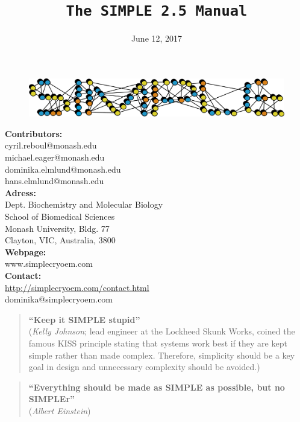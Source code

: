\documentclass[a4paper,11pt]{article}
\newcommand{\prgname}[1]{\textcolor{NavyBlue}{\texttt{#1}}}
\begin{document}
\begin{figure}
\centering
\includegraphics[keepaspectratio=true,scale=0.6]{./SIMPLE_logo/rawlogo}
\end{figure}

\title{\prgname{The SIMPLE 2.5 Manual}}
\date{June 12, 2017}
\maketitle

\vspace{1em}
\begin{minipage}[ht]{0.48\textwidth}
\textbf{Contributors:}\\
cyril.reboul@monash.edu\\
michael.eager@monash.edu\\
dominika.elmlund@monash.edu\\
hans.elmlund@monash.edu\\
\textbf{Adress:}\\
Dept. Biochemistry and Molecular Biology\\
School of Biomedical Sciences\\
Monash University, Bldg. 77\\
Clayton, VIC, Australia, 3800\\
\textbf{Webpage:}\\
www.simplecryoem.com\\
\textbf{Contact:}\\
\url{http://simplecryoem.com/contact.html}\\
dominika@simplecryoem.com\\
\end{minipage}
\vspace{20pt}

\begin{quote}
\textbf{``Keep it SIMPLE stupid''}\\(\textit{Kelly Johnson}; lead engineer at the Lockheed Skunk Works, coined the famous KISS principle stating that systems work best if they are kept simple rather than made complex. Therefore, simplicity should be a key goal in design and unnecessary complexity should be avoided.)
\end{quote}

\begin{quote}
\textbf{``Everything should be made as SIMPLE as possible, but no SIMPLEr''}\\(\textit{Albert Einstein})
\end{quote}
\end{document}
